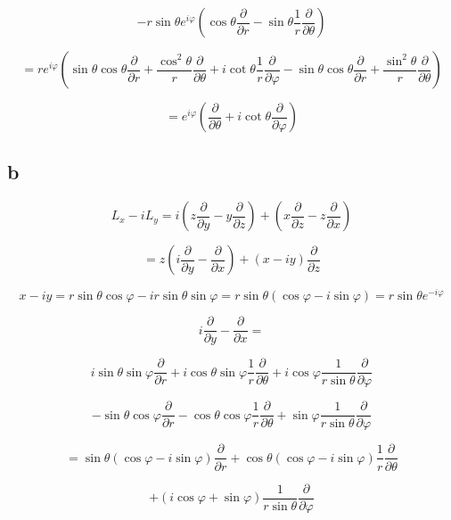 \documentclass[12pt]{article}
\begin{document}
\[
    - r \sin{\theta} e^{i \varphi}
    \left(\cos{\theta} \frac{\partial}{\partial r} - \sin{\theta} \frac{1}{r} \frac{\partial}{\partial \theta}\right)
\]

\[
    = r e^{i \varphi}
    \left(
    \sin{\theta} \cos{\theta} \frac{\partial}{\partial r}
    + \frac{\cos^2{\theta}}{r} \frac{\partial}{\partial \theta}
    + i \cot{\theta} \frac{1}{r}\frac{\partial}{\partial \varphi}
    - \sin{\theta} \cos{\theta} \frac{\partial}{\partial r}
    + \frac{\sin^2{\theta}}{r} \frac{\partial}{\partial \theta}
    \right)
\]

\[
    = e^{i \varphi}
    \left(
    \frac{\partial}{\partial \theta}
    + i \cot{\theta}\frac{\partial}{\partial \varphi}
    \right)
\]

\subsection{b}

\[
    L_x - i L_y = i \left(z \frac{\partial}{\partial y} - y \frac{\partial}{\partial z}\right)
    + \left(x \frac{\partial}{\partial z} - z \frac{\partial}{\partial x}\right)
\]

\[
    = z \left(i \frac{\partial}{\partial y} - \frac{\partial}{\partial x}\right) + \left( x - i y\right)
    \frac{\partial}{\partial z}
\]

\[
    x - i y = r \sin{\theta} \cos{\varphi} - i r \sin{\theta} \sin{\varphi} = r \sin{\theta}
    \left(\cos{\varphi} - i \sin{\varphi}\right) = r \sin{\theta} e^{-i \varphi}
\]

\[
    i \frac{\partial}{\partial y} - \frac{\partial}{\partial x} =
\]

\[
    i  \sin{\theta} \sin{\varphi} \frac{\partial}{\partial r}
    + i \cos{\theta} \sin{\varphi} \frac{1}{r} \frac{\partial}{\partial \theta}
    + i \cos{\varphi} \frac{1}{r \sin{\theta}} \frac{\partial}{\partial \varphi}
\]

\[
    - \sin{\theta} \cos{\varphi} \frac{\partial}{\partial r}
    - \cos{\theta} \cos{\varphi} \frac{1}{r} \frac{\partial}{\partial \theta}
    + \sin{\varphi} \frac{1}{r \sin{\theta}} \frac{\partial}{\partial \varphi}
\]

\[
    = \sin{\theta} \left(\cos{\varphi} - i \sin{\varphi}\right)
    \frac{\partial}{\partial r} + \cos{\theta} \left(\cos{\varphi} - i \sin{\varphi}\right)
    \frac{1}{r} \frac{\partial}{\partial \theta}
\]

\[
    + \left(i \cos{\varphi} + \sin{\varphi}\right) \frac{1}{r \sin{\theta}} \frac{\partial}{\partial \varphi}
\]
\end{document}
